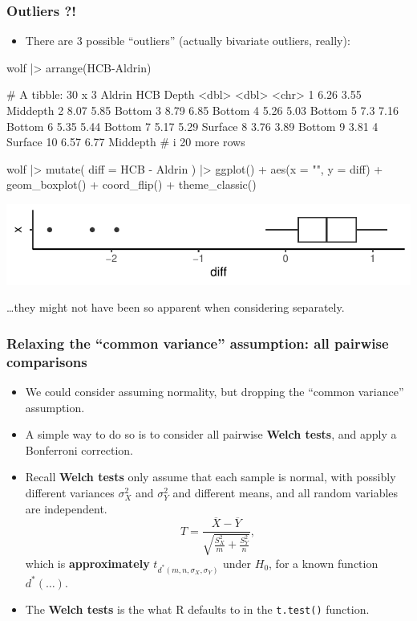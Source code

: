 \documentclass[a4paper]{article}
\begin{document}
\subsubsection{Outliers ?!}
\begin{itemize}
	\item There are 3 possible ``outliers'' (actually bivariate outliers, really):
\end{itemize}
\begin{Schunk}
\begin{Sinput}
wolf |> arrange(HCB-Aldrin)
\end{Sinput}
\begin{Soutput}
# A tibble: 30 x 3
   Aldrin   HCB Depth   
    <dbl> <dbl> <chr>   
 1   6.26  3.55 Middepth
 2   8.07  5.85 Bottom  
 3   8.79  6.85 Bottom  
 4   5.26  5.03 Bottom  
 5   7.3   7.16 Bottom  
 6   5.35  5.44 Bottom  
 7   5.17  5.29 Surface 
 8   3.76  3.89 Bottom  
 9   3.81  4    Surface 
10   6.57  6.77 Middepth
# i 20 more rows
\end{Soutput}
\begin{Sinput}
wolf |> mutate(
  diff = HCB - Aldrin
) |> 
  ggplot() + aes(x = "", y = diff) + 
  geom_boxplot() + 
  coord_flip() +
  theme_classic()
\end{Sinput}


{\centering \includegraphics[width=\maxwidth]{figure/listings-unnamed-chunk-259-1} 

}

\end{Schunk}
\dots they might not have been so apparent when considering separately.
\subsubsection{Relaxing the ``common variance'' assumption: all pairwise comparisons}
\begin{itemize}
	\item We could consider assuming normality, but dropping the ``common variance'' assumption.
	\item A simple way to do so is to consider all pairwise \textbf{Welch tests}, and apply a Bonferroni correction.
	\item Recall \textbf{Welch tests} only assume that each sample is normal, with possibly different variances \( \sigma_X^2 \) and \( \sigma_Y^2 \) and different means, and all random variables are independent.
	\[
		T = \frac{\overline{X} - \overline{Y}}{\sqrt{\frac{S_X^2}{m} + \frac{S_Y^2}{n}}},
	\]
	which is \textbf{approximately} \( t_{d^\ast(m,n,\sigma_X,\sigma_Y)} \) under \( H_0 \), for a known function \( d^\ast(\dots) \).
	\item The \textbf{Welch tests} is the what R defaults to in the \lstinline|t.test()| function.
\end{itemize}
\end{document}
